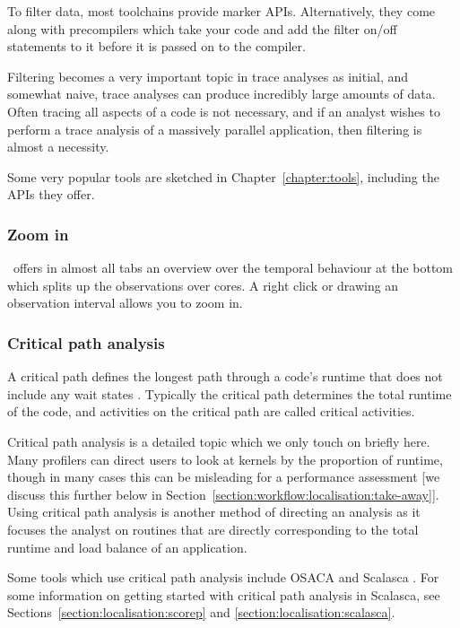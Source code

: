 To filter data, most toolchains provide marker APIs.  Alternatively, they come
along with precompilers which take your code and add the filter on/off
statements to it before it is passed on to the compiler.

Filtering becomes a very important topic in trace analyses as initial, and
somewhat naive, trace analyses can produce incredibly large amounts of data.
Often tracing all aspects of a code is not necessary, and if an analyst wishes
to perform a trace analysis of a massively parallel application, then filtering
is almost a necessity.

Some very popular tools are sketched in Chapter~\ref{chapter:tools}, including
the APIs they offer.

\subsubsection{Zoom in}


\begin{instructions}{\vtune}
 \vtune~offers in almost all tabs an overview over the temporal behaviour at the bottom which splits up the observations over cores.
 A right click or drawing an observation interval allows you to zoom in.  
\end{instructions}

\subsubsection{Critical path analysis}
A critical path defines the longest path through a code's runtime that does not
include any wait states \cite{bohme2012}. Typically the critical path
determines the total runtime of the code, and activities on the critical path
are called critical activities. 

Critical path analysis is a detailed topic which we only touch on briefly here.
Many profilers can direct users to look at kernels by the proportion of
runtime, though in many cases this can be misleading for a performance
assessment [we discuss this further below in
Section~\ref{section:workflow:localisation:take-away}]. Using critical path
analysis is another method of directing an analysis as it focuses the analyst
on routines that are directly corresponding to the total runtime and load
balance of an application.

Some tools which use critical path analysis include OSACA
\cite{laukemann2018,laukemann2019} and Scalasca \cite{geimer2010}. For some
information on getting started with critical path analysis in Scalasca, see
Sections~\ref{section:localisation:scorep} and
\ref{section:localisation:scalasca}.


